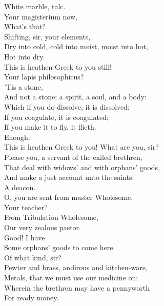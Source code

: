 \documentclass[a4paper,oneside]{memoir}
\begin{document}
\begin{drama*}
White marble, talc.\\
\subtlespeaks {} Your magisterium now,\\
What's that?\\
\facespeaks {} Shifting, sir, your elements,\\
Dry into cold, cold into moist, moist into hot,\\
Hot into dry.\\
\subtlespeaks {} This is heathen Greek to you still!\\
Your lapis philosophicus?\\
\facespeaks {} 'Tis a stone,\\
And not a stone; a spirit, a soul, and a body:\\
Which if you do dissolve, it is dissolved;\\
If you coagulate, it is coagulated;\\
If you make it to fly, it flieth.\\
\subtlespeaks {} Enough.\\
This is heathen Greek to you! What are you, sir?\\
\ananiasspeaks Please you, a servant of the exiled brethren,\\
That deal with widows' and with orphans' goods,\\
And make a just account unto the saints:\\
A deacon.\\
\subtlespeaks {} O, you are sent from master Wholesome,\\
Your teacher?\\
\ananiasspeaks {} From Tribulation Wholesome,\\
Our very zealous pastor.\\
\subtlespeaks {} Good! I have\\
Some orphans' goods to come here.\\
\ananiasspeaks {} Of what kind, sir?\\
\subtlespeaks Pewter and brass, andirons and kitchen-ware,\\
Metals, that we must use our medicine on:\\
Wherein the brethren may have a pennyworth\\
For ready money.\\

\end{drama*}
\end{document}
